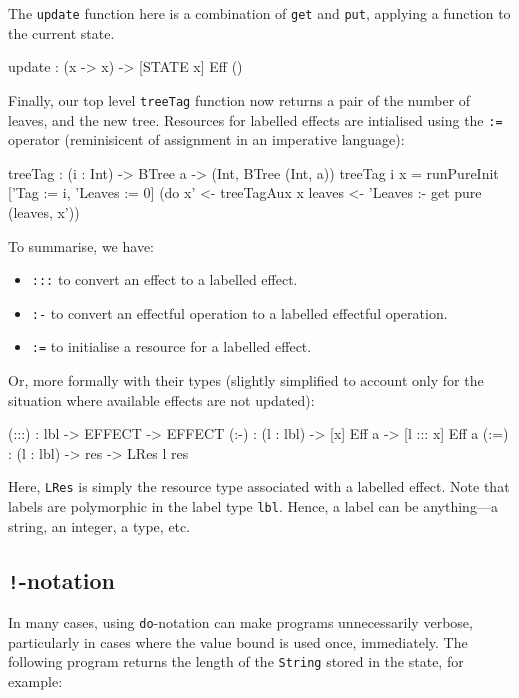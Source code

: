 \noindent
The \texttt{update} function here is a combination of \texttt{get} and \texttt{put},
applying a function to the current state.

\begin{code}
update : (x -> x) -> { [STATE x] } Eff ()
\end{code}

\noindent
Finally, our top level \texttt{treeTag} function now returns a pair of
the number of leaves, and the new tree. Resources for labelled effects are
intialised using the \texttt{:=} operator (reminisicent of assignment in
an imperative language):

\begin{code}
treeTag : (i : Int) -> BTree a -> (Int, BTree (Int, a))
treeTag i x = runPureInit ['Tag := i, 'Leaves := 0]
                    (do x' <- treeTagAux x
                        leaves <- 'Leaves :- get
                        pure (leaves, x'))
\end{code}

\noindent
To summarise, we have:

\begin{itemize}
\item \texttt{:::} to convert an effect to a labelled effect.
\item \texttt{:-} to convert an effectful operation to a labelled effectful operation.
\item \texttt{:=} to initialise a resource for a labelled effect.
\end{itemize}

\noindent
Or, more formally with their types (slightly simplified to account only for
the situation where available effects are not updated):

\begin{code}
(:::) : lbl -> EFFECT -> EFFECT
(:-)  : (l : lbl) -> { [x] } Eff a -> { [l ::: x] } Eff a
(:=)  : (l : lbl) -> res -> LRes l res
\end{code}

\noindent
Here, \texttt{LRes} is simply the resource type associated with a labelled
effect. Note that labels are polymorphic in the label type \texttt{lbl}.
Hence, a label can be anything---a string, an integer, a type, etc.

\subsection{\texttt{!}-notation}

In many cases, using \texttt{do}-notation can make programs unnecessarily
verbose, particularly in cases where the value
bound is used once, immediately. The following program returns the length of
the \texttt{String} stored in the state, for example:

